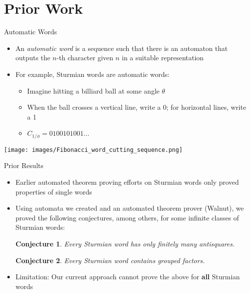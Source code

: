 \documentclass[leqno,presentation]{beamer}
\newtheorem*{conjecture}{Conjecture}
\begin{document}
\section{Prior Work}

\begin{frame}{Automatic Words}

    \begin{itemize}
        \item An \emph{automatic word} is a sequence such that there is an automaton that outputs the $n$-th character given $n$ in a suitable representation
        \item For example, Sturmian words are automatic words: 
            \begin{itemize}
                \item Imagine hitting a billiard ball at some angle $\theta$
                \item When the ball crosses a vertical line, write a 0; for horizontal lines, write a 1
                \item $C_{1/\phi} = 0100101001\ldots$
            \end{itemize}
    \end{itemize}
    
    \texttt{[image: images/Fibonacci\_word\_cutting\_sequence.png]}
\end{frame}

\begin{frame}{Prior Results}
    \begin{itemize}
        \item Earlier automated theorem proving efforts on Sturmian words only proved properties of single words
        
        \item Using automata we created and an automated theorem prover (Walnut), we proved the following conjectures, among others, for some infinite classes of Sturmian words:
        
        \begin{conjecture}\label{conj:antisq}
            Every Sturmian word has only finitely many antisquares.
        \end{conjecture}
                    
        \begin{conjecture}\label{conj:grouped}
            Every Sturmian word contains grouped factors.
        \end{conjecture}
        
        \item Limitation: Our current approach cannot prove the above for \textbf{all} Sturmian words
    \end{itemize}
\end{frame}
\end{document}
